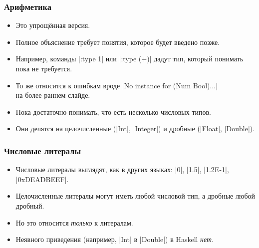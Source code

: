 \documentclass[10pt]{beamer}
\begin{document}
\begin{frame}[fragile]
  \frametitle{Арифметика}
  \begin{itemize}
    \item Это упрощённая версия.
    \item Полное объяснение требует понятия, которое будет введено позже.
    \item Например, команды \haskinline|:type 1| или \haskinline|:type (+)| дадут тип, который понимать пока не требуется.
    \item То же относится к ошибкам вроде \ghcinline[breaklines=false]|No instance for (Num Bool)...|\\ на более раннем слайде.
    \item Пока достаточно понимать, что есть несколько числовых типов.
    \item Они делятся на целочисленные (\haskinline|Int|, \haskinline|Integer|) и дробные (\haskinline|Float|, \haskinline|Double|).
  \end{itemize}
\end{frame}

\begin{frame}[fragile]
  \frametitle{Числовые литералы}
  \begin{itemize}
    \item Числовые литералы выглядят, как в других языках: \haskinline|0|, \haskinline|1.5|, \haskinline|1.2E-1|, \haskinline|0xDEADBEEF|.
    \item Целочисленные литералы могут иметь любой числовой тип, а дробные любой дробный.
    \item Но это относится \emph{только} к литералам.
    \item Неявного приведения (например, \haskinline|Int| в \haskinline|Double|) в Haskell \emph{нет}.
  \end{itemize}
\end{frame}
\end{document}
